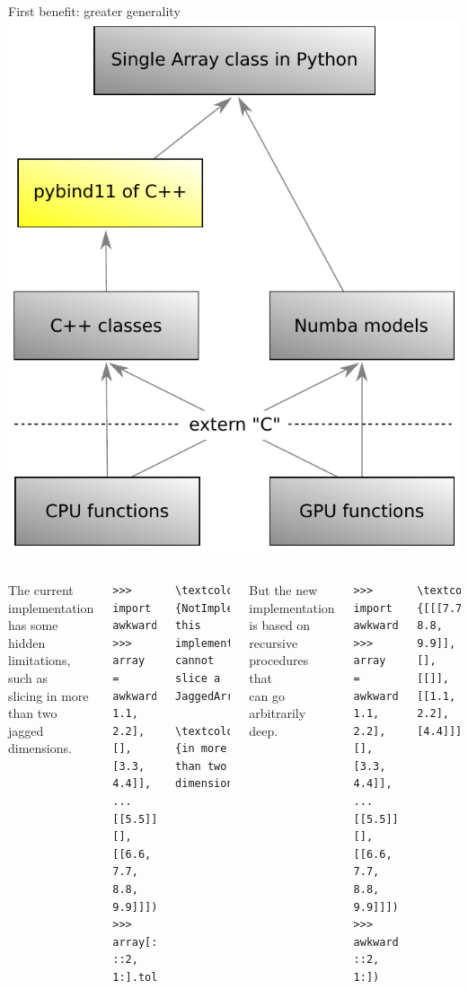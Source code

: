 \documentclass[aspectratio=169]{beamer}
\begin{document}
\begin{frame}[fragile]{First benefit: greater generality}
\large
\vspace{0.35 cm}
\hfill\mbox{\includegraphics[height=4 cm]{awkward-1-0-layers-mini-pybind11.pdf}\hspace{-0.75 cm}}

\vspace{-4 cm}
\begin{columns}
The current implementation has some hidden limitations, such as \\ slicing in more than two jagged dimensions.

\scriptsize
\begin{verbatim}
>>> import awkward
>>> array = awkward.fromiter([[[0.0, 1.1, 2.2], [], [3.3, 4.4]],
...                           [[5.5]], [], [[6.6, 7.7, 8.8, 9.9]]])
>>> array[::-1, ::2, 1:].tolist()
\end{verbatim}
\begin{Verbatim}[commandchars=\\\{\}]
\textcolor{red}{NotImplementedError: this implementation cannot slice a JaggedArray}
                     \textcolor{red}{in more than two dimensions}
\end{Verbatim}

\large
\vspace{0.5 cm}
But the new implementation is based on recursive procedures that \\ can go arbitrarily deep.

\scriptsize
\begin{verbatim}
>>> import awkward1
>>> array = awkward1.fromiter([[[0.0, 1.1, 2.2], [], [3.3, 4.4]],
...                            [[5.5]], [], [[6.6, 7.7, 8.8, 9.9]]])
>>> awkward1.tolist(array[::-1, ::2, 1:])
\end{verbatim}
\begin{Verbatim}[commandchars=\\\{\}]
\textcolor{red}{[[[7.7, 8.8, 9.9]], [], [[]], [[1.1, 2.2], [4.4]]]}
\end{Verbatim}

\vspace{5 cm}
\end{columns}
\end{frame}
\end{document}
